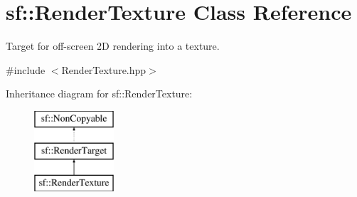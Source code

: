 \hypertarget{classsf_1_1RenderTexture}{\section{sf\-:\-:Render\-Texture Class Reference}
\label{classsf_1_1RenderTexture}
}


Target for off-\/screen 2\-D rendering into a texture.  




{\ttfamily \#include $<$Render\-Texture.\-hpp$>$}

Inheritance diagram for sf\-:\-:Render\-Texture\-:\begin{figure}[H]
\begin{center}
\leavevmode
\includegraphics[height=3.000000cm]{classsf_1_1RenderTexture}
\end{center}
\end{figure}
